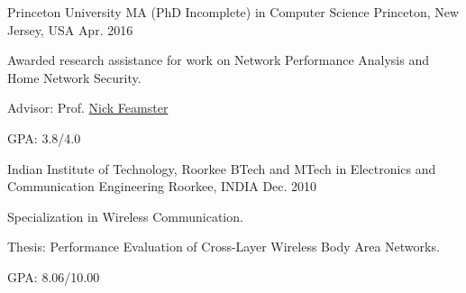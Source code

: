 

\begin{cventries}

\cventry
    {Princeton University} %
    {MA (PhD Incomplete) in Computer Science} %
    {Princeton, New Jersey, USA} %
    {Apr. 2016} %
    {
      \begin{cvitems} %
      	\item {Awarded research assistance for work on Network Performance Analysis and Home Network Security.}
      	\item {Advisor: Prof. \href{https://www.cs.princeton.edu/~feamster}{Nick Feamster}}
      	\item {GPA: 3.8/4.0}
      \end{cvitems}
    }

\cventry  
    {Indian Institute of Technology, Roorkee} %
    {BTech and MTech in Electronics and Communication Engineering} %
    {Roorkee, INDIA} %
    {Dec. 2010} %
    {
      \begin{cvitems} %
      	\item {Specialization in Wireless Communication.}
      	\item {Thesis: Performance Evaluation of Cross-Layer Wireless Body Area Networks.}
      	\item {GPA: 8.06/10.00}
      \end{cvitems}
    }

\end{cventries}
